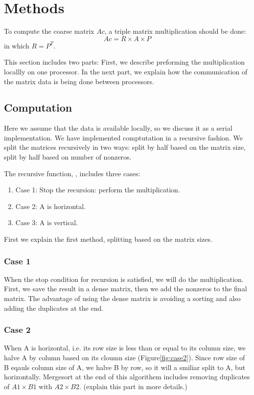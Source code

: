 \section{Methods}
\label{sec:methods}

To compute the coarse matrix $Ac$, a triple matrix multiplication should be done:
\begin{equation}
 Ac = R \times A \times P
\end{equation}
in which $R = P^T$.

This section includes two parts: First, we describe preforming the multiplication locallly on one processor. In the next part, we explain how the communication of the matrix data is being done between processors.


\subsection{Computation}
\label{sec:comp}
Here we assume that the data is available locally, so we discuss it as a serial implementation. We have implemented comptutation in a recursive fashion. We split the matrices recursively in two ways: split by half based on the matrix size, split by half based on number of nonzeros. 

The recursive function, \recmm, includes three cases:
\begin{enumerate}
 \item Case 1: Stop the recursion: perform the multiplication.
 \item Case 2: A is horizontal.
 \item Case 3: A is vertical.
\end{enumerate}

First we explain the first method, splitting based on the matrix sizes.

\subsubsection{Case 1}
\label{sec:case1}
When the stop condition for recursion is satisfied, we will do the multiplication. 
First, we save the result in a dense matrix, then we add the nonzeros to the final matrix. The advantage of using the dense matrix is avoiding a sorting and also adding the duplicates at the end.

\subsubsection{Case 2}
\label{sec:case2}
When A is horizontal, i.e. its row size is less than or equal to its column size, we halve A by column based on its cloumn size (Figure\ref{fig:case2}). Since row size of B eqauls column size of A, we halve B by row, so it will a smiliar split to A, but horizontally. Mergesort at the end of this algorithem includes removing duplicates of $A1 \times B1$ with $A2 \times B2$. (explain this part in more details.)

